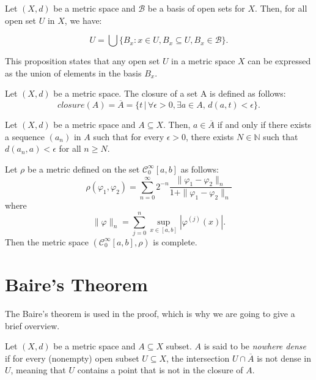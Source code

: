 \documentclass[../main.tex]{subfiles}
\begin{document}
\begin{propo}
Let $(X, d)$ be a metric space and $\mathcal{B}$ be a basis of open sets for $X$. Then, for all open set $U$ in $X$, we have:

$$U = \bigcup \{B_x : x \in U, B_x \subseteq U, B_x \in \mathcal{B}\}.$$

\noindent This proposition states that any open set $U$ in a metric space $X$ can be expressed as the union of elements in the basis $B_x$.
\end{propo}


\begin{definition}Let $(X, d)$ be a metric space. The closure of a set A is defined as follows:
	$$closure(A) = \overline{A}=\{t \, |  \, \forall \epsilon> 0, \exists a \in A, \, d(a, t) < \epsilon\}.$$
\end{definition}

\begin{propo} \label{prop:23} Let $(X, d)$ be a metric space and $A \subseteq X$. Then, $a \in \overline{A}$ if and only if there exists a sequence $(a_n)$ in $A$ such that for every $\epsilon > 0$, there exists $N \in \mathbb{N}$ such that $d(a_n, a) < \epsilon$ for all $n \geq N.$
\end{propo}

\begin{propo} \cite[Prop. 7]{frech} \label{prop:frech}
	Let $\rho$ be a metric defined on the set $\mathcal{C}^\infty_0[a,b]$ as follows:
	$$\rho(\varphi_1,\varphi_2) = \sum_{n=0}^\infty 2^{-n}  \frac{\|\varphi_1 -\varphi_2\|_n}{1+\|\varphi_1 -\varphi_2\|_n}$$ where $$\|\varphi\|_n= \sum_{j=0}^n \sup_{x\in [a,b]} | \varphi^{(j)}(x)|. $$  Then the metric space $(\mathcal{C}^\infty_0[a,b],\rho)$  is complete.
\end{propo}




\section{Baire's Theorem}
\noindent The Baire's theorem is used in the proof, which is why we are going to give a brief overview.

\begin{definition} Let $(X,d)$ be a metric space and $A\subseteq X$ subset. $A$ is said to be \emph{nowhere dense} if for every (nonempty) open subset $U\subseteq X$, the intersection $U\cap\overline{A}$ is not dense in $U$, meaning that $U$ contains a point that is not in the closure of $A$.
\end{definition}
\end{document}
